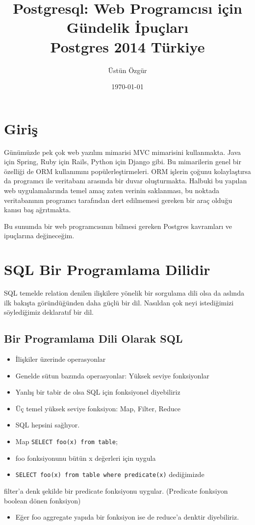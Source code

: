 \documentclass[11pt]{article}
\author{Üstün Özgür}
\date{\today}
\title{Postgresql: Web Programcısı için Gündelik İpuçları \\ Postgres 2014 Türkiye}
\begin{document}
\maketitle
\tableofcontents


\section{Giriş}
\label{sec-1}

Günümüzde pek çok web yazılım mimarisi MVC mimarisini kullanmakta. Java için
Spring, Ruby için Rails, Python için Django gibi. Bu mimarilerin genel bir
özelliği de ORM kullanımını popülerleştirmeleri. ORM işlerin çoğunu
kolaylaştırsa da programcı ile veritabanı arasında bir duvar
oluşturmakta. Halbuki bu yapılan web uygulamalarında temel amaç zaten verinin
saklanması, bu noktada veritabanının programcı tarafından dert edilmemesi
gereken bir araç olduğu kanısı baş ağrıtmakta.

Bu sunumda bir web programcısının bilmesi gereken Postgres kavramları ve
ipuçlarına değineceğim.

\section{SQL Bir Programlama Dilidir}
\label{sec-2}

SQL temelde relation denilen ilişkilere yönelik bir sorgulama dili olsa da
aslında ilk bakışta göründüğünden daha güçlü bir dil. Nasıldan çok neyi
istediğimizi söylediğimiz deklaratıf bir dil.


\subsection{Bir Programlama Dili Olarak SQL}
\label{sec-2-1}

\begin{itemize}
\item İlişkiler üzerinde operasyonlar
\item Genelde sütun bazında operasyonlar: Yüksek seviye fonksiyonlar
\item Yanlış bir tabir de olsa SQL için fonksiyonel diyebiliriz
\item Üç temel yüksek seviye fonksiyon: Map, Filter, Reduce
\item SQL hepsini sağlıyor.
\item Map \texttt{SELECT foo(x) from table};
\item foo fonksiyonunu bütün x değerleri için uygula
\item \texttt{SELECT foo(x) from table where predicate(x)} dediğimizde
\end{itemize}
filter'a denk şekilde bir predicate fonksiyonu uygular. (Predicate fonksiyon
boolean dönen fonksiyon)
\begin{itemize}
\item Eğer foo aggregate yapıda bir fonksiyon ise de reduce'a denktir diyebiliriz.
\end{itemize}
\end{document}
